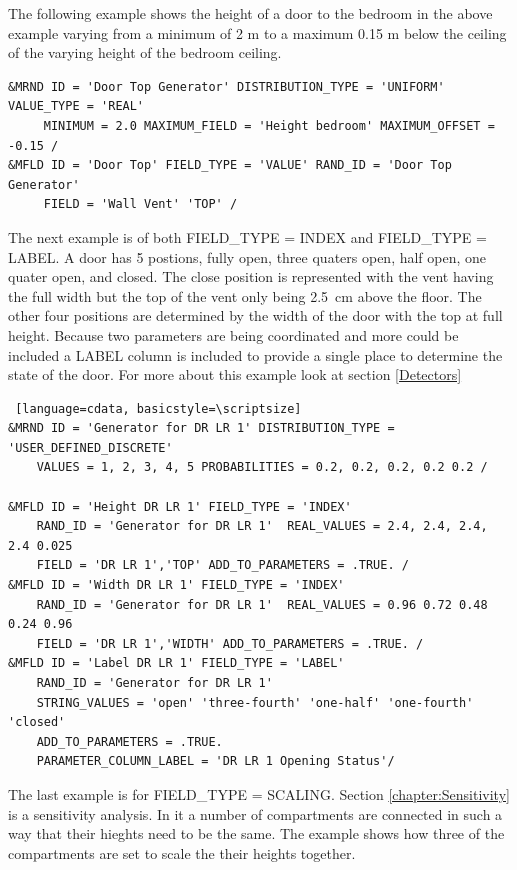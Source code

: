 \documentclass[12pt,twoside]{book}
\begin{document}
The following example shows the height of a door to the bedroom in the above example varying from a minimum of 2 m to a maximum 0.15 m below the ceiling of the varying height of the bedroom ceiling.

\begin{lstlisting}[language=cdata, basicstyle=\scriptsize]
&MRND ID = 'Door Top Generator' DISTRIBUTION_TYPE = 'UNIFORM' VALUE_TYPE = 'REAL'
     MINIMUM = 2.0 MAXIMUM_FIELD = 'Height bedroom' MAXIMUM_OFFSET = -0.15 /
&MFLD ID = 'Door Top' FIELD_TYPE = 'VALUE' RAND_ID = 'Door Top Generator'
     FIELD = 'Wall Vent' 'TOP' /
\end{lstlisting}

The next example is of both {\ct FIELD\_TYPE = INDEX} and {\ct FIELD\_TYPE = LABEL}. A door has 5 postions, fully open, three quaters open, half open, one quater open, and closed. The close position is represented with the vent having the full width but the top of the vent only being 2.5~cm above the floor. The other four positions are determined by the width of the door with the top at full height. Because two parameters are being coordinated and more could be included a {\ct LABEL} column is included to provide a single place to determine the state of the door. For more about this example look at section \ref{Detectors}

\vspace{\baselineskip}
\begin{lstlisting} [language=cdata, basicstyle=\scriptsize]
&MRND ID = 'Generator for DR LR 1' DISTRIBUTION_TYPE = 'USER_DEFINED_DISCRETE'
    VALUES = 1, 2, 3, 4, 5 PROBABILITIES = 0.2, 0.2, 0.2, 0.2 0.2 /

&MFLD ID = 'Height DR LR 1' FIELD_TYPE = 'INDEX'
    RAND_ID = 'Generator for DR LR 1'  REAL_VALUES = 2.4, 2.4, 2.4, 2.4 0.025
    FIELD = 'DR LR 1','TOP' ADD_TO_PARAMETERS = .TRUE. /
&MFLD ID = 'Width DR LR 1' FIELD_TYPE = 'INDEX'
    RAND_ID = 'Generator for DR LR 1'  REAL_VALUES = 0.96 0.72 0.48 0.24 0.96
    FIELD = 'DR LR 1','WIDTH' ADD_TO_PARAMETERS = .TRUE. /
&MFLD ID = 'Label DR LR 1' FIELD_TYPE = 'LABEL'
    RAND_ID = 'Generator for DR LR 1'
    STRING_VALUES = 'open' 'three-fourth' 'one-half' 'one-fourth' 'closed'
    ADD_TO_PARAMETERS = .TRUE.
    PARAMETER_COLUMN_LABEL = 'DR LR 1 Opening Status'/
\end{lstlisting}

The last example is for {\ct FIELD\_TYPE = SCALING}. Section \ref{chapter:Sensitivity} is a sensitivity analysis. In it a number of compartments are connected in such a way that their hieghts need to be the same. The example shows how three of the compartments are set to scale the their heights together.
\end{document}
